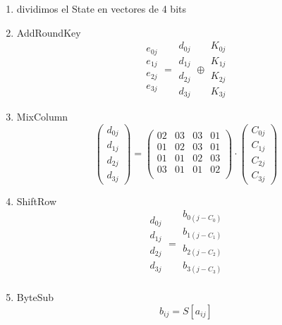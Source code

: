 \begin{enumerate}
	\item dividimos el State en vectores de 4 bits
	\item AddRoundKey
	$$\begin{matrix}
	e_{0j}\\
	e_{1j}\\
	e_{2j}\\
	e_{3j}
	\end{matrix} = \begin{matrix}
	d_{0j}\\
	d_{1j}\\
	d_{2j}\\
	d_{3j}
	\end{matrix} \oplus \begin{matrix}
	K_{0j}\\
	K_{1j}\\
	K_{2j}\\
	K_{3j}
	\end{matrix}$$
	
	\item MixColumn
		$$\left(\begin{matrix}
		d_{0j}\\d_{1j}\\d_{2j}\\d_{3j}
		\end{matrix} \right) = \left(\begin{matrix}
		02 & 03 & 03 & 01\\
		01 & 02 & 03 & 01\\
		01 & 01 & 02 & 03\\
		03 & 01 & 01 & 02\\
		\end{matrix}\right) \cdot \left( \begin{matrix}
		C_{0j}\\
		C_{1j}\\
		C_{2j}\\
		C_{3j}
		\end{matrix}\right)$$
		
	\item ShiftRow
	$$\begin{matrix}
	d_{0j}\\d_{1j}\\d_{2j}\\d_{3j}
	\end{matrix} = \begin{matrix}
	b_{0(j-C_0)}\\b_{1(j-C_1)}\\b_{2(j-C_2)}\\b_{3(j-C_3)}\\
	\end{matrix}$$
	\item ByteSub
	$$b_{ij} = S[a_{ij}]$$
\end{enumerate}

